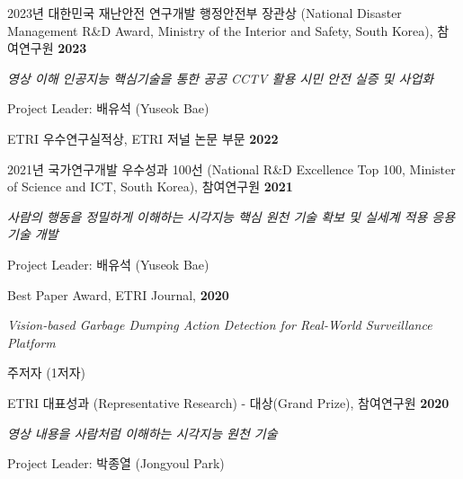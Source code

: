 \documentclass[10pt]{article}
\newenvironment{outerlist}[1][\enskip\textbullet]%
        {\begin{itemize}[#1]}{\end{itemize}%
         \vspace{-.6\baselineskip}}
\newenvironment{innerlist}[1][\enskip\textbullet]%
        {\begin{compactitem}[#1]}{\end{compactitem}}
\begin{document}
2023년 대한민국 재난안전 연구개발 행정안전부 장관상 (National Disaster Management R\&D Award, Ministry of the Interior and Safety, South Korea), 참여연구원 \hfill \textbf{2023}
\begin{outerlist}
\item[] \textit{영상 이해 인공지능 핵심기술을 통한 공공 CCTV 활용 시민 안전 실증 및 사업화}%
    \begin{innerlist}
	    \item Project Leader: 배유석 (Yuseok Bae)
	\end{innerlist}
\end{outerlist}
\vspace{0.5cm}

ETRI 우수연구실적상, ETRI 저널 논문 부문  \hfill \textbf{2022}
\vspace{0.5cm}

2021년 국가연구개발 우수성과 100선  (National R\&D Excellence Top 100, Minister of Science and ICT, South Korea), 참여연구원 \hfill \textbf{2021}
\begin{outerlist}
\item[] \textit{사람의 행동을 정밀하게 이해하는 시각지능 핵심 원천 기술 확보 및 실세계 적용 응용 기술 개발}%
    \begin{innerlist}
	    \item Project Leader: 배유석 (Yuseok Bae)
	\end{innerlist}
\end{outerlist}
\vspace{0.5cm}

Best Paper Award, ETRI Journal, \hfill \textbf{2020}
\begin{outerlist}
\item[] \textit{Vision-based Garbage Dumping Action Detection for Real-World Surveillance Platform}%
 \begin{innerlist}
	    \item 주저자 (1저자)
	\end{innerlist}
\end{outerlist}
\vspace{0.5cm}
		

ETRI 대표성과 (Representative Research) - 대상(Grand Prize), 참여연구원  \hfill \textbf{2020}
\begin{outerlist}
\item[] \textit{영상 내용을 사람처럼 이해하는 시각지능 원천 기술}%
    \begin{innerlist}
	    \item Project Leader: 박종열 (Jongyoul Park)
	\end{innerlist}
\end{outerlist}
\vspace{0.5cm}
		
\end{document}
